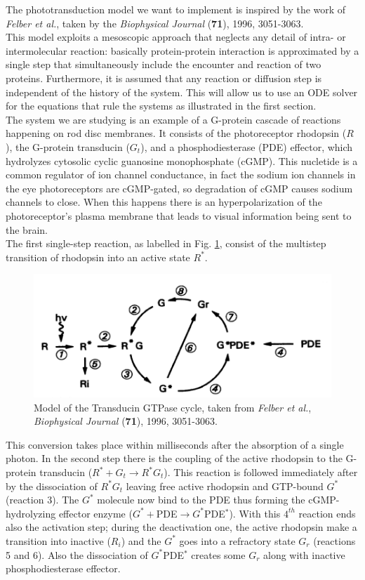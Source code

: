 \documentclass[pdf, color,12pt]{CITnote}
\begin{document}
The phototransduction model we want to implement is inspired by the work of \textit{Felber et al.}, taken by the \textit{Biophysical Journal} (\textbf{71}), 1996, 3051-3063.
\\ This model exploits a mesoscopic approach that neglects any detail of intra- or intermolecular reaction: basically protein-protein
interaction is approximated by a single step that simultaneously include the
encounter and reaction of two proteins. Furthermore, it is assumed
that any reaction or diffusion step is independent of the
history of the system. 
This will allow us to use an ODE solver for the equations that rule the systems as illustrated in the first section.
\\ The system we are studying is an example of a G-protein cascade of reactions happening on rod disc membranes. It consists of the photoreceptor rhodopsin ($R$), the G-protein transducin ($G_t$), and a
phosphodiesterase (PDE) effector, which hydrolyzes cytosolic cyclic guanosine monophosphate (cGMP). This nucletide is a common regulator of ion channel conductance, in fact the sodium ion channels in the eye photoreceptors are cGMP-gated, so degradation of cGMP causes sodium channels to close. When this happens there is an hyperpolarization of the photoreceptor's plasma membrane that leads to visual information being sent to the brain.
\\
The first single-step reaction, as labelled in Fig.$ $ \ref{fig: one}, consist of the multistep transition of rhodopsin into an active state $R^*$.
\begin{figure}[ht!]
\centering
\centerline{\includegraphics[scale=0.4]{WS2.png}}
\caption{\small{ Model of the Transducin GTPase cycle, taken from \textit{Felber et al.}, \textit{Biophysical Journal} (\textbf{71}), 1996, 3051-3063. }}
\label{fig: one}
\end{figure}
This conversion takes place within milliseconds after the absorption of a single photon. In the second step there is the coupling of the active rhodopsin to the G-protein transducin ($R^*+G_t\rightarrow R^*G_t$). This reaction is followed immediately after by the dissociation of $R^*G_t$ leaving free active rhodopsin and GTP-bound $G^*$ (reaction 3). The $G^*$ molecule now bind to the PDE thus forming the cGMP-hydrolyzing effector enzyme ($G^*+$PDE$\rightarrow G^*$PDE$^*$). With this $4^{th}$ reaction ends also the activation step; during the deactivation one, the active rhodopsin make a transition into inactive ($R_i$) and the $G^*$ goes into a refractory state $G_r$ (reactions 5 and 6). Also the dissociation of $G^*$PDE$^*$ creates some $G_r$ along with inactive phosphodiesterase effector.
\end{document}
